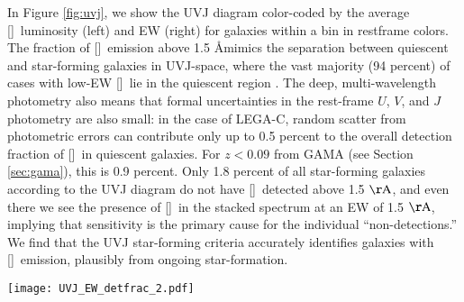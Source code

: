 \documentclass[twocolumn,natbib,iop,hyperref]{aastex62}
\newcommand{\oii}{[\ion{O}{2}]}
\begin{document}
In Figure \ref{fig:uvj}, we show the UVJ diagram color-coded by the average \oii\ luminosity (left) and EW (right) for galaxies within a bin in restframe colors.  The  fraction of \oii\ emission above 1.5 \AA mimics the separation between quiescent and star-forming galaxies in UVJ-space, where the vast majority (94 percent) of cases with low-EW \oii\ lie in the quiescent region \cite[see also][]{2016MNRAS.463.2363K}.  The deep, multi-wavelength photometry also means that formal uncertainties in the rest-frame $U$, $V$, and $J$ photometry are also small: in the case of LEGA-C, random scatter from photometric errors can contribute only up to 0.5 percent to the overall detection fraction of \oii\ in quiescent galaxies.  For $z < 0.09$ from GAMA (see Section \ref{sec:gama}), this is 0.9 percent.  Only 1.8 percent of all star-forming galaxies according to the UVJ diagram do not have \oii\ detected above 1.5 $\mathrm{\AA}$, and even there we see the presence of \oii\ in the stacked spectrum at an EW of 1.5 $\mathrm{\AA}$, implying that sensitivity is the primary cause for the individual ``non-detections.''  We find that the UVJ star-forming criteria accurately identifies galaxies with \oii\ emission, plausibly from ongoing star-formation.  

\begin{figure*}
\begin{center}
\texttt{[image: UVJ\_EW\_detfrac\_2.pdf]}%
\caption{Restframe $U-V$ and $V-J$ colors from \texttt{EAZY} \citep{2008ApJ...686.1503B} for the LEGA-C sample color-coded by the fraction of sources with \oii\ EW $>$ 1.5 \AA\ (left) and \oii\ EW (right) for all galaxies within each bin.  The dividing line between quiescent and star-forming from \citet{2011ApJ...735...86W} is denoted with the dashed lines.  The deep UltraVISTA photometry results in small formal errors in the calculated rest-frame colors (typically less than 0.1 magnitudes), and hence photometric scatter cannot be the primary cause of the high \oii\ detection fractions in color-selected quiescent galaxies.  When splitting the sample into to bins with equal numbers of sources (solid line), we observe that galaxies with redder $U-V$ and $V-J$ colors have systematically larger detection fractions and median EWs (text labels).}
\label{fig:uvj}
\end{center}
\end{figure*}
\end{document}
